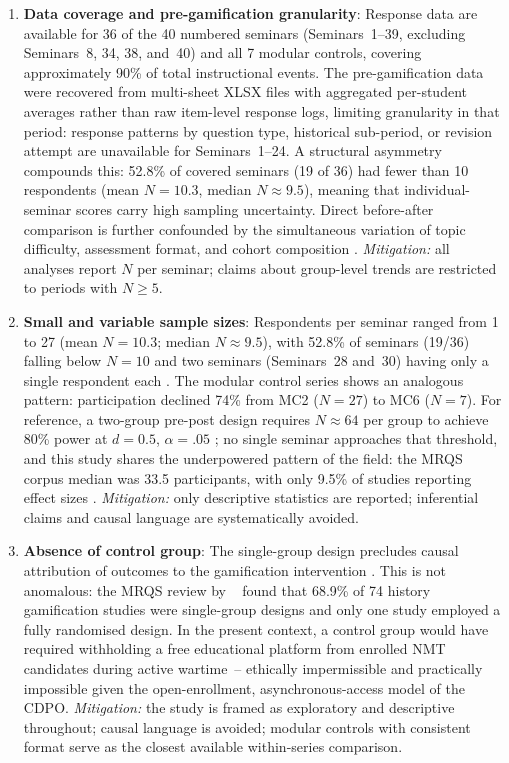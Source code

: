 \begin{enumerate}

\item \textbf{Data coverage and pre-gamification granularity}: Response data are available for 36 of the 40 numbered seminars (Seminars~1--39, excluding Seminars~8, 34, 38, and~40) and all 7 modular controls, covering approximately 90\% of total instructional events. The pre-gamification data were recovered from multi-sheet XLSX files with aggregated per-student averages rather than raw item-level response logs, limiting granularity in that period: response patterns by question type, historical sub-period, or revision attempt are unavailable for Seminars~1--24. A structural asymmetry compounds this: 52.8\% of covered seminars (19 of 36) had fewer than 10 respondents (mean $N = 10.3$, median $N \approx 9.5$), meaning that individual-seminar scores carry high sampling uncertainty. Direct before-after comparison is further confounded by the simultaneous variation of topic difficulty, assessment format, and cohort composition \cite{DichevDicheva2017, Korniienko2025mrqs}. \textit{Mitigation:} all analyses report $N$ per seminar; claims about group-level trends are restricted to periods with $N \geq 5$.

\item \textbf{Small and variable sample sizes}: Respondents per seminar ranged from 1 to 27 (mean $N = 10.3$; median $N \approx 9.5$), with 52.8\% of seminars (19/36) falling below $N = 10$ and two seminars (Seminars~28 and~30) having only a single respondent each \cite{Borenstein2009, Korniienko2025mrqs}. The modular control series shows an analogous pattern: participation declined 74\% from MC2 ($N = 27$) to MC6 ($N = 7$). For reference, a two-group pre-post design requires $N \approx 64$ per group to achieve 80\% power at $d = 0.5$, $\alpha = .05$ \cite{Borenstein2009}; no single seminar approaches that threshold, and this study shares the underpowered pattern of the field: the MRQS corpus median was 33.5 participants, with only 9.5\% of studies reporting effect sizes \cite{Korniienko2025mrqs}. \textit{Mitigation:} only descriptive statistics are reported; inferential claims and causal language are systematically avoided.

\item \textbf{Absence of control group}: The single-group design precludes causal attribution of outcomes to the gamification intervention \cite{Schulz2010CONSORT, creswell}. This is not anomalous: the MRQS review by \citeauthor{Korniienko2025mrqs}~\cite{Korniienko2025mrqs} found that 68.9\% of 74 history gamification studies were single-group designs and only one study employed a fully randomised design. In the present context, a control group would have required withholding a free educational platform from enrolled NMT candidates during active wartime~-- ethically impermissible \cite{Reeves2003} and practically impossible given the open-enrollment, asynchronous-access model of the CDPO. \textit{Mitigation:} the study is framed as exploratory and descriptive throughout; causal language is avoided; modular controls with consistent format serve as the closest available within-series comparison.


\end{enumerate}
